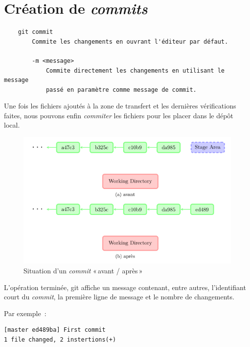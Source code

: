 \documentclass[a4paper,11pt]{style-esi/td}
\begin{document}
\section{Création de \textit{commits}}

\begin{colxbox}[colback=white,drop fuzzy shadow]
	\begin{verbatim}
	git commit
	    Commite les changements en ouvrant l'éditeur par défaut. 

	    -m <message>
	        Commite directement les changements en utilisant le message 
	        passé en paramètre comme message de commit. 
	\end{verbatim}
\end{colxbox}
\bigskip 

Une fois les fichiers ajoutés à la zone de transfert et les dernières
vérifications faites, nous pouvons enfin \textit{commiter} les fichiers pour
les placer dans le dépôt local. 

\begin{figure}[h]
	\centering
	\includegraphics[width=\linewidth]{img/depot-git-commit.png}
	\caption{Situation d'un \textit{commit} « avant / après » }
	\label{fig:git-commit}
\end{figure}

L'opération terminée, git affiche un message contenant, entre autres, l'identifiant court du \textit{commit}, la première ligne de message et le nombre de changements. 

\pagebreak
Par exemple~:

\begin{verbatim}
[master ed489ba] First commit
1 file changed, 2 instertions(+)
\end{verbatim}
\end{document}
